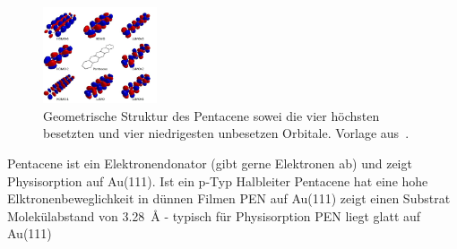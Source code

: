         \begin{figure}
            \centering
            \includegraphics[width=0.3\textwidth]{./content/PEN.jpg}
            \caption{Geometrische Struktur des Pentacene sowei die vier höchsten besetzten und vier niedrigesten unbesetzen Orbitale. Vorlage aus~\cite{PEN}.}
            \label{fig:PEN}
        \end{figure}
        
        \textbf{\cite{5A_1}}
        Pentacene ist ein Elektronendonator (gibt gerne Elektronen ab) und zeigt Physisorption auf Au(111).
        Ist ein p-Typ Halbleiter
        Pentacene hat eine hohe Elktronenbeweglichkeit in dünnen Filmen
        PEN auf Au(111) zeigt einen Substrat Molekülabstand von \SI{3.28}{\angstrom} - typisch für Physisorption
        PEN liegt glatt auf Au(111)
    